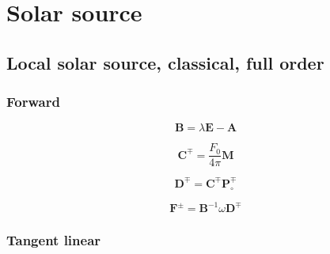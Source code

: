 %
\section{Solar source}
\label{sec:solar_source}


\subsection{Local solar source, classical, full order}
\label{sec:solar_source-local_solar_source-classical_full_order}


\subsubsection{Forward}
\label{sec:solar_source-local_solar_source-classical_full_order-forward}

\begin{equation}
\mathbf{B} = \lambda \mathbf{E} - \mathbf{A}
\label{eq:solar_source-local_solar_source-classical_full_order-forward-B}
\end{equation}

\begin{equation}
\mathbf{C}^{\mp} = \frac{F_{0}}{4\pi} \mathbf{M}
\label{eq:solar_source-local_solar_source-classical_full_order-forward-C}
\end{equation}

\begin{equation}
\mathbf{D}^{\mp} = \mathbf{C}^{\mp}\mathbf{P}^{\mp}_{\circ}
\label{eq:solar_source-local_solar_source-classical_full_order-forward-D}
\end{equation}

\begin{equation}
\mathbf{F}^{\pm} = \mathbf{B}^{-1}\omega\mathbf{D}^{\mp}
\label{eq:solar_source-local_solar_source-classical_full_order-forward-F}
\end{equation}


%
\subsubsection{Tangent linear}
\label{sec:solar_source-local_solar_source-classical_full_order-tangent_linear}

